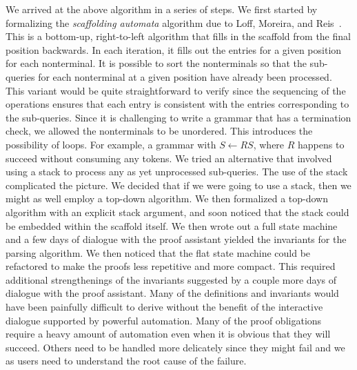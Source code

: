 \documentclass[sigplan,10pt,anonymous,review]{acmart}\settopmatter{printfolios=true,printccs=false,printacmref=false}
\newcommand{\prodn}[2]{#1 \leftarrow #2}
\begin{document}
\begin{CCSXML}
We arrived at the above algorithm in a series of steps.  We first
started by formalizing the \emph{scaffolding automata} algorithm due to Loff,
Moreira, and Reis~\cite{loff2020computational}.  This is a bottom-up, right-to-left algorithm that
fills in the scaffold from the final position backwards.  In each
iteration, it fills out the entries for a given position for each
nonterminal.  It is possible to sort the nonterminals so that the
sub-queries for each nonterminal at a given position have already been
processed.  This variant would be quite straightforward to verify
since the sequencing of the operations ensures that each entry is
consistent with the entries corresponding to the sub-queries.  Since
it is challenging to write a grammar that has a termination check, we
allowed the nonterminals to be unordered.  This introduces the
possibility of loops.  For example, a grammar with $\prodn{S}{R S}$,
where $R$ happens to succeed without consuming any tokens.  We tried
an alternative that involved using a stack to process any as yet
unprocessed sub-queries.  The use of the stack complicated the
picture.  We decided that if we were going to use a stack, then we
might as well employ a top-down algorithm.  We then formalized a
top-down algorithm with an explicit stack argument, and soon noticed
that the stack could be embedded within the scaffold itself.  We then
wrote out a full state machine and a few days of dialogue with the
proof assistant yielded the invariants for the parsing algorithm.  We
then noticed that the flat state machine could be refactored to make
the proofs less repetitive and more compact.  This required additional
strengthenings of the invariants suggested by a couple more days of
dialogue with the proof assistant.  Many of the definitions and
invariants would have been painfully difficult to derive without the
benefit of the interactive dialogue supported by powerful automation.
Many of the proof obligations require a heavy amount of automation
even when it is obvious that they will succeed.  Others need to be
handled more delicately since they might fail and we as users need to
understand the root cause of the failure.  




\end{CCSXML}
\end{document}
